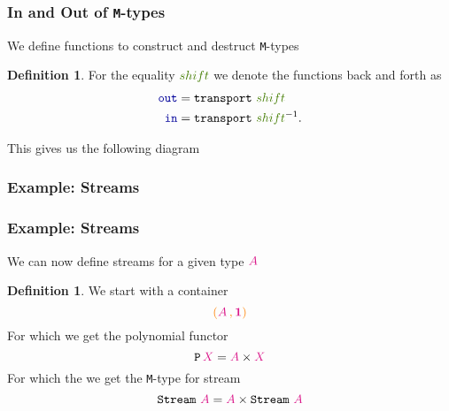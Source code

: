 \documentclass[xelatex,mathserif,serif,notheorems]{beamer} %
\theoremstyle{plain} %
\theoremstyle{definition}
\newtheorem{defn}[thm]{Definition}%
\theoremstyle{remark}
\newcommand*{\pathterm}[1]{\textcolor{green!65!red!75!black}{#1}}
\newcommand*{\type}[1]{\textcolor{magenta!90!black}{#1}}
\newcommand*{\container}[1]{\textcolor{orange}{#1}}
\newcommand*{\containerpair}[2]{\ensuremath{\colorlet{savedleftcolor}{.}\color{orange}\left(\color{savedleftcolor}#1\,\textcolor{orange}{\mathbf{,}}\,#2\color{orange}\right)\color{savedleftcolor}}}
\newcommand*{\unit}{\type{\textbf{1}}}
\newcommand*{\function}[1]{\textcolor{blue!60!black}{\ensuremath{\mathtt{#1}}}}
\newcommand*{\destructor}[1]{\textcolor{yellow!60!black}{\ensuremath{\mathtt{#1}}}}
\newcommand*{\typeformer}[1]{\ensuremath{\mathtt{#1}}}
\newcommand*{\functor}[1]{\ensuremath{\mathbf{\mathtt{#1}}}}
\newcommand*{\sym}[1]{\ensuremath{#1^{-1}}}
\newcommand{\setlengths}{
  \setlength{\abovedisplayskip}{4pt}
  \setlength{\belowdisplayskip}{4pt}
  \setlength{\abovedisplayshortskip}{2pt}
  \setlength{\belowdisplayshortskip}{2pt}
}
\begin{document}
\begin{frame}
  \frametitle{In and Out of \texttt{M}-types}
  We define functions to construct and destruct \texttt{M}-types
  \begin{defn}\setlengths
    For the equality \(\pathterm{shift}\) we denote the functions back and forth as
    \begin{align}
      \function{out} &= \mathtt{transport}~\pathterm{shift} \\
      \function{in} &= \mathtt{transport}~\sym{\pathterm{shift}}.
    \end{align}
  \end{defn}
  This gives us the following diagram
  \begin{figure}[h]
    \centering
  \end{figure}
\end{frame}

\subsubsection{Example: Streams}
\begin{frame}[fragile]
  \frametitle{Example: Streams}
  We can now define streams for a given type \(\type{A}\)
  \begin{defn}\setlengths
    We start with a container
    \begin{equation}
      \containerpair{\type{A}}{\unit}
    \end{equation}
    For which we get the polynomial functor
    \begin{equation}
      \functor{P}\,\type{X} = \type{A} \times \type{X}
    \end{equation}
    For which the we get the \texttt{M}-type for stream
    \begin{equation}
      \typeformer{Stream}~\type{A} = \type{A} \times \typeformer{Stream}~\type{A}
    \end{equation}
  \end{defn}
    \begin{figure}[h]
    \centering
  \end{figure}
\end{frame}
\end{document}
